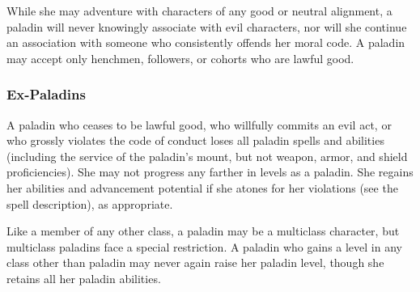  While she may adventure with characters of any good or neutral alignment, a paladin will never knowingly associate with evil characters, nor will she continue an association with someone who consistently offends her moral code. A paladin may accept only henchmen, followers, or cohorts who are lawful good.

\subsubsection{Ex-Paladins}
A paladin who ceases to be lawful good, who willfully commits an evil act, or who grossly violates the code of conduct loses all paladin spells and abilities (including the service of the paladin's mount, but not weapon, armor, and shield proficiencies). She may not progress any farther in levels as a paladin. She regains her abilities and advancement potential if she atones for her violations (see the  spell description), as appropriate.

Like a member of any other class, a paladin may be a multiclass character, but multiclass paladins face a special restriction. A paladin who gains a level in any class other than paladin may never again raise her paladin level, though she retains all her paladin abilities.


